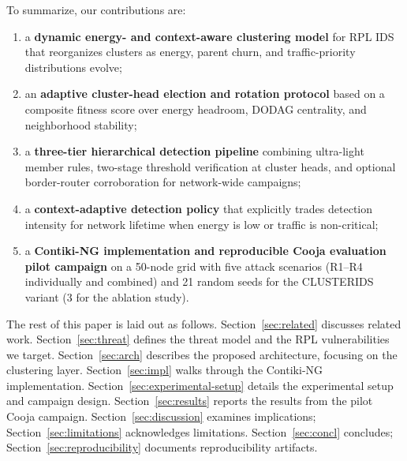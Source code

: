 \noindent To summarize, our contributions are:
\begin{enumerate}
  \item a \textbf{dynamic energy- and context-aware clustering model} for RPL IDS that reorganizes clusters as energy, parent churn, and traffic-priority distributions evolve;
  \item an \textbf{adaptive cluster-head election and rotation protocol} based on a composite fitness score over energy headroom, DODAG centrality, and neighborhood stability;
  \item a \textbf{three-tier hierarchical detection pipeline} combining ultra-light member rules, two-stage threshold verification at cluster heads, and optional border-router corroboration for network-wide campaigns;
  \item a \textbf{context-adaptive detection policy} that explicitly trades detection intensity for network lifetime when energy is low or traffic is non-critical;
  \item a \textbf{Contiki-NG implementation and reproducible Cooja evaluation pilot campaign} on a 50-node grid with five attack scenarios (R1--R4 individually and combined) and 21 random seeds for the CLUSTERIDS variant (3 for the ablation study).
\end{enumerate}

The rest of this paper is laid out as follows.
Section~\ref{sec:related} discusses related work.
Section~\ref{sec:threat} defines the threat model and the RPL vulnerabilities we target.
Section~\ref{sec:arch} describes the proposed architecture, focusing on the clustering layer.
Section~\ref{sec:impl} walks through the Contiki-NG implementation.
Section~\ref{sec:experimental-setup} details the experimental setup and campaign design.
Section~\ref{sec:results} reports the results from the pilot Cooja campaign.
Section~\ref{sec:discussion} examines implications; Section~\ref{sec:limitations} acknowledges limitations.
Section~\ref{sec:concl} concludes; Section~\ref{sec:reproducibility} documents reproducibility artifacts.
